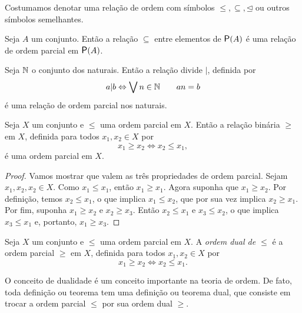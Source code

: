 	Costumamos denotar uma relação de ordem com símbolos $\leq, \subseteq, \unlhd$ ou outros símbolos semelhantes.
	
\begin{example}
	Seja $A$ um conjunto. Então a relação $\subseteq$ entre elementos de $\p(A)$ é uma relação de ordem parcial em $\p(A)$.
\end{example}

\begin{example}
	Seja $\mathbb{N}$ o conjunto dos naturais. Então a relação divide $|$, definida por
	\begin{equation*}
	a|b \Leftrightarrow \bigvee\nolimits n \in \mathbb{N} \qquad an=b
	\end{equation*}
é uma relação de ordem parcial nos naturais.
\end{example}

\begin{proposition}
	Seja $X$ um conjunto e $\leq$ uma ordem parcial em $X$. Então a relação binária $\geq$ em $X$, definida para todos $x_1,x_2 \in X$ por
	\begin{equation*}
	x_1 \geq x_2 \Leftrightarrow x_2 \leq x_1,
	\end{equation*}
é uma ordem parcial em $X$.
\end{proposition}
\begin{proof}
	Vamos mostrar que valem as três propriedades de ordem parcial. Sejam $x_1,x_2,x_2 \in X$. Como $x_1 \leq x_1$, então $x_1 \geq x_1$. Agora suponha que $x_1 \geq x_2$. Por definição, temos $x_2 \leq x_1$, o que implica $x_1 \leq x_2$, que por sua vez implica $x_2 \geq x_1$. Por fim, suponha $x_1 \geq x_2$ e $x_2 \geq x_3$. Então $x_2 \leq x_1$ e $x_3 \leq x_2$, o que implica $x_3 \leq x_1$ e, portanto, $x_1 \geq x_3$.
\end{proof}

\begin{definition}
	Seja $X$ um conjunto e $\leq$ uma ordem parcial em $X$. A \emph{ordem dual de $\leq$} é a ordem parcial $\geq$ em $X$, definida para todos $x_1,x_2 \in X$ por
	\begin{equation*}
	x_1 \geq x_2 \Leftrightarrow x_2 \leq x_1.
	\end{equation*}
\end{definition}

	O conceito de dualidade é um conceito importante na teoria de ordem. De fato, toda definição ou teorema tem uma definição ou teorema dual, que consiste em trocar a ordem parcial $\leq$ por sua ordem dual $\geq$.

